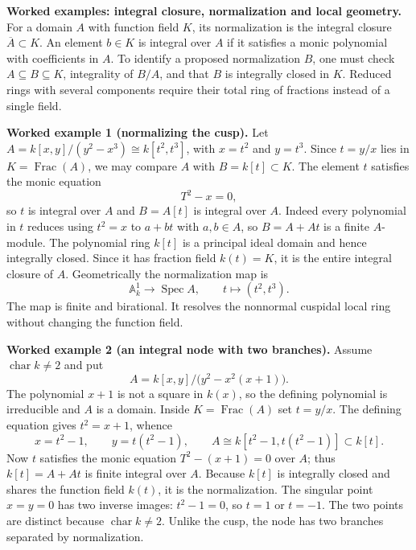 \par\medskip
\noindent\textbf{Worked examples: integral closure, normalization and local geometry.}
For a domain $A$ with function field $K$, its normalization is the
integral closure $\overline A\subset K$.  An element $b\in K$ is
integral over $A$ if it satisfies a monic polynomial with coefficients
in $A$.  To identify a proposed normalization $B$, one must check
$A\subseteq B\subseteq K$, integrality of $B/A$, and that $B$ is
integrally closed in $K$.  Reduced rings with several components
require their total ring of fractions instead of a single field.

\par\medskip
\noindent\textbf{Worked example 1 (normalizing the cusp).}
Let $A=k[x,y]/(y^2-x^3)\cong k[t^2,t^3]$, with
$x=t^2$ and $y=t^3$.  Since $t=y/x$ lies in $K=\operatorname{Frac}(A)$,
we may compare $A$ with $B=k[t]\subset K$.
The element $t$ satisfies the monic equation
\[
 T^2-x=0,
\]
so $t$ is integral over $A$ and $B=A[t]$ is integral over $A$.
Indeed every polynomial in $t$ reduces using $t^2=x$ to
$a+bt$ with $a,b\in A$, so $B=A+At$ is a finite $A$-module.
The polynomial ring $k[t]$ is a principal ideal domain and hence
integrally closed.  Since it has fraction field $k(t)=K$, it is the
entire integral closure of $A$.
Geometrically the normalization map is
\[
 \mathbb A^1_k\longrightarrow \operatorname{Spec}A,
 \qquad t\longmapsto(t^2,t^3).
\]
The map is finite and birational.  It resolves the nonnormal
cuspidal local ring without changing the function field.

\par\medskip
\noindent\textbf{Worked example 2 (an integral node with two branches).}
Assume $\operatorname{char}k\ne2$ and put
\[
 A=k[x,y]/\bigl(y^2-x^2(x+1)\bigr).
\]
The polynomial $x+1$ is not a square in $k(x)$, so the defining
polynomial is irreducible and $A$ is a domain.
Inside $K=\operatorname{Frac}(A)$ set $t=y/x$.  The defining equation
gives $t^2=x+1$, whence
\[
 x=t^2-1,\qquad y=t(t^2-1),\qquad
 A\cong k[t^2-1,t(t^2-1)]\subset k[t].
\]
Now $t$ satisfies the monic equation $T^2-(x+1)=0$ over $A$;
thus $k[t]=A+At$ is finite integral over $A$.  Because $k[t]$ is
integrally closed and shares the function field $k(t)$, it is the
normalization.  The singular point $x=y=0$ has two inverse images:
$t^2-1=0$, so $t=1$ or $t=-1$.  The two points are distinct
because $\operatorname{char}k\ne2$.  Unlike the cusp, the node has
two branches separated by normalization.

